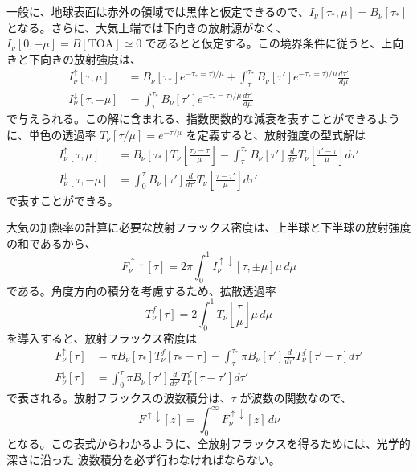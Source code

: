\documentclass[article]{dennou777}
\begin{document}
一般に、地球表面は赤外の領域では黒体と仮定できるので、$I_\nu[\tau_*,\mu]=B_\nu[\tau_*]$
となる。さらに、大気上端では下向きの放射源がなく、 $I_\nu[0,-\mu]=B[\mathrm{TOA}]\simeq0$
であるとと仮定する。この境界条件に従うと、上向きと下向きの放射強度は、
\begin{align}
	I^\uparrow_\nu[\tau,\mu]
		&=B_\nu[\tau_*]e^{-\tau_*=\tau)/\mu}
		+\int^{\tau_*}_\tau B_\nu[\tau']e^{-\tau_*=\tau)/\mu}\frac{d\tau'}{d\mu}\\
	I^\downarrow_\nu[\tau,-\mu]
		&=\int^{\tau_*}_\tau B_\nu[\tau']e^{-\tau_*=\tau)/\mu}\frac{d\tau'}{d\mu}
\end{align}
で与えられる。この解に含まれる、指数関数的な減衰を表すことができるように、単色の透過率
$T_\nu[\tau/\mu]=e^{-\tau/\mu}$ を定義すると、放射強度の型式解は
\begin{align}
	I^\uparrow_\nu[\tau,\mu]
		&=B_\nu[\tau_*]T_\nu\left[\frac{\tau_\nu-\tau}{\mu}\right]
		-\int^{\tau_*}_\tau B_\nu[\tau']\frac{d}{d\tau'}T_\nu\left[\frac{\tau'-\tau}{\mu}\right]d\tau'\\
	I^\downarrow_\nu[\tau,-\mu]
		&=\int^\tau_0 B_\nu[\tau']\frac{d}{d\tau'}T_\nu\left[\frac{\tau-\tau'}{\mu}\right]d\tau'
\end{align}
で表すことができる。

大気の加熱率の計算に必要な放射フラックス密度は、上半球と下半球の放射強度の和であるから、
\begin{equation}
	F^{\uparrow\downarrow}_\nu[\tau]=2\pi\int^1_0 I^{\uparrow\downarrow}_\nu[\tau,\pm\mu]\mu\,d\mu
\end{equation}
である。角度方向の積分を考慮するため、拡散透過率
\begin{equation}
	T^f_\nu[\tau]=2\int^1_0 T_\nu\left[\frac{\tau}{\mu}\right]\mu\,d\mu
\end{equation}
を導入すると、放射フラックス密度は
\begin{align}
	F^\uparrow_\nu[\tau]
		&=\pi B_\nu[\tau_*]T^f_\nu[\tau_*-\tau]
		-\int^{\tau_*}_\tau \pi B_\nu[\tau']\frac{d}{d\tau'}T^f_\nu[\tau'-\tau]d\tau'\\
	F^\downarrow_\nu[\tau]
		&=\int^\tau_0 \pi B_\nu[\tau']\frac{d}{d\tau'}T^f_\nu[\tau-\tau']d\tau'
\end{align}
で表される。放射フラックスの波数積分は、$\tau$ が波数の関数なので、
\begin{equation}
	F^{\uparrow\downarrow}[z]=\int^\infty_0 F^{\uparrow\downarrow}_\nu[z]\,d\nu
\end{equation}
となる。この表式からわかるように、全放射フラックスを得るためには、光学的深さに沿った
波数積分を必ず行わなければならない。
\end{document}
